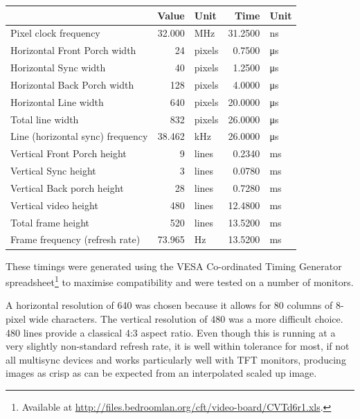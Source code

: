 \begin{center}
\label{table:vdu-timings}
\zebra
\begin{tabular}{lrlrl}
            & Value & Unit & Time & Unit \\
\hline
Pixel clock frequency            &   32.000 & MHz    &  31.2500 & ns \\
\hline
Horizontal Front Porch width     &       24 & pixels &  0.7500 & μs \\
Horizontal Sync width            &       40 & pixels &  1.2500 & μs \\
Horizontal Back Porch width      &      128 & pixels &  4.0000 & μs \\
Horizontal Line width            &      640 & pixels & 20.0000 & μs \\
Total line width                 &      832 & pixels & 26.0000 & μs \\
Line (horizontal sync) frequency &   38.462 & kHz    & 26.0000 & μs \\
\hline
Vertical Front Porch height      &        9 & lines &   0.2340 & ms \\
Vertical Sync height             &        3 & lines &   0.0780 & ms \\
Vertical Back porch height       &       28 & lines &   0.7280 & ms \\
Vertical video height            &      480 & lines &  12.4800 & ms \\
Total frame height               &      520 & lines &  13.5200 & ms \\
Frame frequency (refresh rate)   &   73.965 & Hz    &  13.5200 & ms \\
\hline
\end{tabular}
\end{center}

These timings were generated using the VESA Co-ordinated Timing Generator
spreadsheet\footnote{Available at
  \url{http://files.bedroomlan.org/cft/video-board/CVTd6r1.xls}.} to maximise
compatibility and were tested on a number of monitors.

A horizontal resolution of 640 was chosen because it allows for 80 columns of
8-pixel wide characters. The vertical resolution of 480 was a more difficult
choice. 480 lines provide a classical 4:3 aspect ratio. Even though this is
running at a very slightly non-standard refresh rate, it is well within
tolerance for most, if not all multisync devices and works particularly well
with TFT monitors, producing images as crisp as can be expected from an
interpolated scaled up image.


